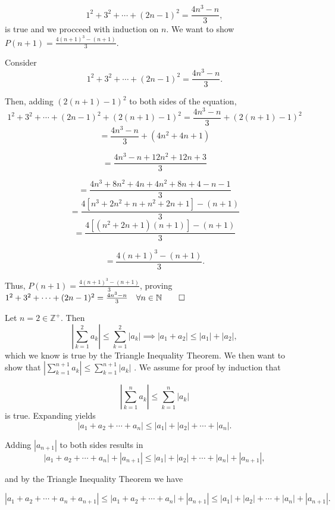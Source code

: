 \documentclass{report}
\begin{document}
$$ 1^{2}+3^{2}+\cdots+(2 n-1)^{2}=\frac{4 n^{3}-n}{3}, $$
is true and we procceed with induction on $n$. We want to show $P(n+1) = \frac{4 (n+1)^{3}-(n+1)}{3}$.

Consider
$$
1^{2}+3^{2}+\cdots+(2 n-1)^{2} =\frac{4 n^{3}-n}{3}.$$

Then, adding $(2 (n+1)-1)^{2}$ to both sides of the equation,
$$ 
1^{2}+3^{2}+\cdots+(2 n-1)^{2} +(2 (n+1)-1)^{2}=\frac{4 n^{3}-n}{3} + (2 (n+1)-1)^{2} 
$$  
$$ 
=\frac{4 n^{3}-n}{3} + (4n^2+4n +1) 
$$  

$$ 
=\frac{4 n^{3}-n+12n^2+12n +3}{3}
$$  

$$ 
=\frac{4 n^{3} + 8n^2 + 4n + 4n^2 + 8n + 4 -n -1}{3}
$$  
$$ 
=\frac{4 [n^{3} + 2n^2 + n + n^2 + 2n + 1] -(n +1)}{3}
$$  
$$ 
=\frac{4 [(n^{2} + 2n + 1)(n+1)] -(n+1)}{3}
$$  

$$ 
=\frac{4 (n+1)^3 -(n+1)}{3}.
$$  

Thus, $P(n+1) = \frac{4 (n+1)^{3}-(n+1)}{3}$, proving $1^{2}+3^{2}+\cdots+(2 n-1)^{2}=\frac{4 n^{3}-n}{3} \quad \forall n \in \mathbb{N} \qed$  

\bigskip
{}

\sol
Let $n=2 \in \mathbb{Z}^{+}$. Then 
$$
\left|\sum_{k=1}^{2} a_{k}\right| \leq \sum_{k=1}^{2}\left|a_{k}\right| \implies
\left|a_1 + a_2\right| \leq \left| a_1\right| + \left| a_2\right|,$$ which we know is true by the Triangle Inequality Theorem. We then want to show that $\left|\sum_{k=1}^{n+1} a_{k}\right| \leq \sum_{k=1}^{n+1}\left|a_{k}\right|$
.
We assume for proof by induction that

$$
\left|\sum_{k=1}^{n} a_{k}\right| \leq \sum_{k=1}^{n}\left|a_{k}\right|$$ is true.
Expanding yields
$$                                                                       
\left|a_1 + a_2 + \cdots + a_n\right| \leq \left|a_{1}\right| + \left|a_{2}\right|
+ \cdots +  \left|a_{n}\right|.$$

Adding $\left|a_{n+1}\right|$ to both sides results in
$$
\left|a_1 + a_2 + \cdots + a_n\right| + \left|a_{n+1}\right|  \leq \left|a_{1}\right| + \left|a_{2}\right|
+ \cdots +  \left|a_{n}\right|  + \left|a_{n+1}\right|,$$

and by the Triangle Inequality Theorem we have

$$
\left|a_1 + a_2 + \cdots + a_n + a_{n+1}\right|  \leq
\left|a_1 + a_2 + \cdots + a_n\right| + \left|a_{n+1}\right|  \leq \left|a_{1}\right| + \left|a_{2}\right|
+ \cdots +  \left|a_{n}\right|  + \left|a_{n+1}\right|.$$
\end{document}

